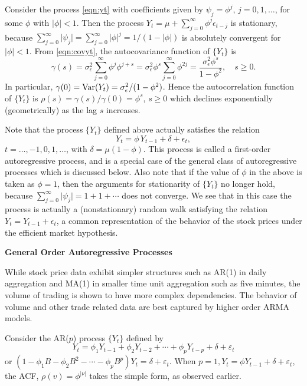 \begin{ex} \label{ex:autoregor1}
Consider the process \eqref{eqn:yt} with coefficients given by $\psi_j = \phi^j$, $j= 0,1,\ldots$,  for some $\phi$ with $\lvert \phi \rvert < 1$. Then the process $Y_t = \mu + \sum_{j=0}^{\infty} \phi^j \epsilon_{t-j}$ is stationary, because $\sum_{j=0}^{\infty} \lvert \psi_j \rvert= \sum_{j=0}^{\infty} \lvert \phi \rvert^j = 1/(1 - \lvert \phi \rvert)$ is absolutely convergent for $\lvert \phi \rvert < 1$. From \eqref{eqn:covyt}, the autocovariance function of $\{ Y_t \}$ is
	\[
	\gamma(s)= \sigma^2_{\epsilon} \sum_{j=0}^{\infty} \phi^j \phi^{j+s}= \sigma^2_{\epsilon} \phi^s \sum_{j=0}^{\infty} \phi^{2j}= \frac{\sigma^2_{\epsilon} \phi^s}{1 - \phi^2}, \quad s \geq 0.
	\]
In particular, $\gamma(0) = \operatorname{Var}(Y_t) = \sigma^2_{\epsilon}/(1-\phi^2)$. Hence the autocorrelation function of $\{ Y_t \}$ is $\rho(s)= \gamma(s) / \gamma(0)= \phi^s$, $ s \geq 0$ which declines exponentially (geometrically) as the lag $s$ increases.


Note that the process $\{Y_t\}$ defined above actually satisfies the relation 
	\[
	Y_t= \phi \, Y_{t-1} + \delta+\epsilon_t,
	\]
$t= \ldots ,-1, 0, 1, \ldots$, with $\delta = \mu(1 - \phi)$. This process is called a first-order autoregressive process, and is a special case of the general class of autoregressive processes which is discussed below. Also note that if the value of $\phi$ in the above is taken as  $\phi = 1$, then the arguments for stationarity of $\{Y_t\}$ no longer hold, because $\sum_{j=0}^{\infty} \lvert \psi_j \rvert = 1 + 1 + \cdots$ does not converge. We see that in this case the process is actually a (nonstationary) random walk satisfying the relation  $Y_t = Y_{t-1} + \epsilon_t$, a common representation of the behavior of the stock prices under the efficient market hypothesis. \xqed
\end{ex}


\noindent\textbf{General Order Autoregressive Processes} \twomedskip


While stock price data exhibit simpler structures such as AR(1) in daily aggregation and MA(1) in smaller time unit aggregation such as five minutes, the volume of trading is shown to have more complex dependencies. The behavior of volume and other trade related data are best captured by higher order ARMA models. 


Consider the AR($p$) process $\{ Y_t \}$ defined by
	\begin{equation} \label{eqn:ytsum}
	Y_t = \phi_1 Y_{t-1} + \phi_2 Y_{t-2} + \cdots + \phi_p Y_{t-p} + \delta + \varepsilon_t
	\end{equation}
or $(1 - \phi_1 B - \phi_2 B^2 - \cdots - \phi_p B^p) Y_t = \delta + \varepsilon_t$. When $p= 1, Y_t = \phi Y_{t-1} + \delta + \varepsilon_t$, the ACF, $\rho(v)= \phi^{\lvert \nu \rvert}$ takes the simple form, as observed earlier.


